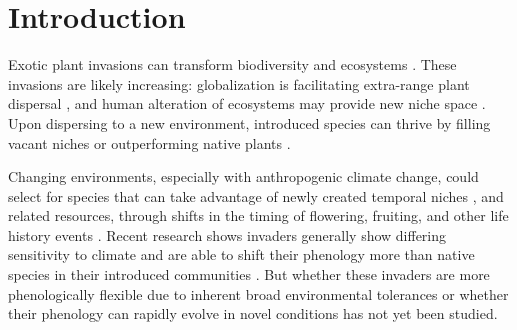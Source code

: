 \documentclass[11pt]{article}\usepackage[]{graphicx}\usepackage[]{color}
\begin{document}
	\section{Introduction} 
	Exotic plant invasions  can transform biodiversity and ecosystems \parencite{Bellard2016, Pejchar2009,Mack2000}. %
These invasions are likely increasing: globalization is facilitating extra-range plant dispersal \parencite{Helmus2014}, and human alteration of ecosystems may provide new niche space \parencite{Tilman2001, Blois2013,Inouye2008,Harte2015}. Upon dispersing to a new environment, introduced species can thrive by filling vacant niches \parencite{Elton1958} or outperforming native plants %
\parencite{Davis2001,Daehler2003}. 

Changing environments, especially with anthropogenic climate change, could select for species that can take advantage of newly created temporal niches \parencite{Wolkovich2011,godoy2014}, and related resources, through shifts in the timing of flowering, fruiting, and other life history events \parencite{Franks2007}. Recent research shows invaders generally show differing sensitivity to climate \parencite{Reeb2020} and are  able to shift their phenology more than native species in their introduced communities \parencite{Wolkovich2014,Reeb2020,Zettlemoyer2019}. But whether these invaders are more phenologically flexible due to inherent broad environmental tolerances or whether their phenology can rapidly evolve in novel conditions has not yet been studied.%
\end{document}

